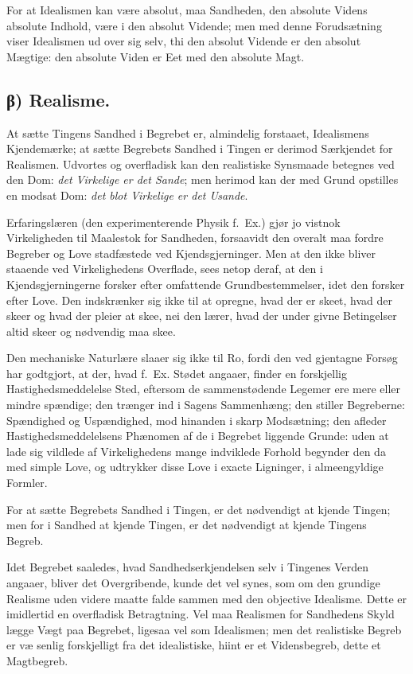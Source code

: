 \documentclass[12pt]{book}
\newcommand{\opage}[1]{\marginnote{\footnotesize\textit{[#1]}}}
\begin{document}
For at Idealismen kan være absolut, maa Sandheden, den absolute
Videns absolute Indhold, være i den absolut Vidende; men med denne
Forudsætning viser Idealismen ud over sig selv, thi den absolut
Vidende er den absolut Mægtige: den absolute Viden er Eet med den
absolute Magt.

\subsection*{β) Realisme.}

At sætte Tingens Sandhed i Begrebet er, almindelig forstaaet,
Idealismens Kjendemærke; at sætte Begrebets Sandhed i Tingen er
derimod Særkjendet for Realismen. Udvortes og overfladisk kan den
realistiske Synsmaade betegnes ved den Dom: \emph{det Virkelige er
det
\opage{67} Sande}; men herimod kan der med Grund opstilles en modsat Dom:
\emph{det blot Virkelige er det Usande}.

Erfaringslæren (den experimenterende Physik f.~Ex.) gjør jo vistnok
Virkeligheden til Maalestok for Sandheden, forsaavidt den overalt
maa fordre Begreber og Love stadfæstede ved Kjendsgjerninger. Men at
den ikke bliver staaende ved Virkelighedens Overflade, sees netop
deraf, at den i Kjendsgjerningerne forsker efter omfattende
Grundbestemmelser, idet den forsker efter Love. Den indskrænker sig
ikke til at opregne, hvad der er skeet, hvad der skeer og hvad der
pleier at skee, nei den lærer, hvad der under givne Betingelser
altid skeer og nødvendig maa skee.

Den mechaniske Naturlære slaaer sig ikke til Ro, fordi den ved
gjentagne Forsøg har godtgjort, at der, hvad f.~Ex. Stødet angaaer,
finder en forskjellig Hastighedsmeddelelse Sted, eftersom de
sammenstødende Legemer ere mere eller mindre spændige; den trænger
ind i Sagens Sammenhæng; den stiller Begreberne: Spændighed og
Uspændighed, mod hinanden i skarp Modsætning; den afleder
Hastighedsmeddelelsens Phænomen af de i Begrebet liggende Grunde:
uden at lade sig vildlede af Virkelighedens mange indviklede Forhold
begynder den da med simple Love, og udtrykker disse Love i exacte
Ligninger, i almeengyldige Formler.

For at sætte Begrebets Sandhed i Tingen, er det nødvendigt at kjende
Tingen; men for i Sandhed at kjende Tingen, er det nødvendigt at
kjende Tingens Begreb.

Idet Begrebet saaledes, hvad Sandhedserkjendelsen selv i Tingenes
Verden angaaer, bliver det Overgribende, kunde det vel synes, som om
den grundige Realisme uden videre maatte falde sammen med den
objective Idealisme. Dette er imidlertid en overfladisk Betragtning.
Vel maa Realismen for Sandhedens Skyld lægge Vægt paa Begrebet,
ligesaa vel som Idealismen; men det realistiske Begreb er væ\-%
\opage{68}senlig forskjelligt fra det idealistiske, hiint er et Vidensbegreb,
dette et Magtbegreb.
\end{document}
